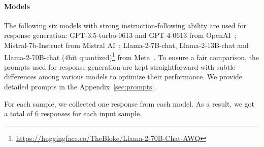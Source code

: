 \documentclass[11pt]{article}
\begin{document}
\paragraph{Models} 
The following six models with strong instruction-following ability are used for response generation: GPT-3.5-turbo-0613 and GPT-4-0613 from OpenAI~\cite{openai2023gpt4}; Mistral-7b-Instruct from Mistral AI~\cite{jiang2023mistral}; Llama-2-7B-chat, Llama-2-13B-chat and Llama-2-70B-chat (4bit quantized)\footnote{\url{https://huggingface.co/TheBloke/Llama-2-70B-Chat-AWQ}} from Meta~\cite{touvron2023llama}. To ensure a fair comparison, the prompts used for response generation are kept straightforward with subtle differences among various models to optimize their performance. We provide detailed prompts in the Appendix~\ref{sec:prompts}. 

For each sample, we collected one response from each model.
As a result, we got a total of 6 responses for each input sample.




\end{document}
